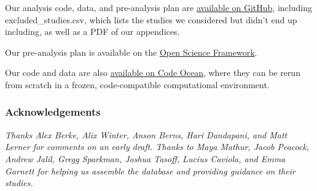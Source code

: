 \documentclass[
  letterpaper,
  DIV=11,
  numbers=noendperiod]{scrartcl}
\begin{document}
Our analysis code, data, and pre-analysis plan are
\href{https://github.com/setgree/vegan-meta/tree/main}{available on
GitHub}, including excluded\_studies.csv, which lists the studies we
considered but didn't end up including, as well as a PDF of our
appendices.

Our pre-analysis plan is available on the
\href{https://osf.io/3sth2}{Open Science Framework}.

Our code and data are also
\href{https://doi.org/10.24433/CO.6020578.v1}{available on Code Ocean},
where they can be rerun from scratch in a frozen, code-compatible
computational environment.

\hypertarget{acknowledgements}{%
\subsubsection{Acknowledgements}\label{acknowledgements}}

\emph{Thanks Alex Berke, Alix Winter, Anson Berns, Hari Dandapani, and
Matt Lerner for comments on an early draft. Thanks to Maya Mathur, Jacob
Peacock, Andrew Jalil, Gregg Sparkman, Joshua Tasoff, Lucius Caviola,
and Emma Garnett for helping us assemble the database and providing
guidance on their studies.}
\end{document}
